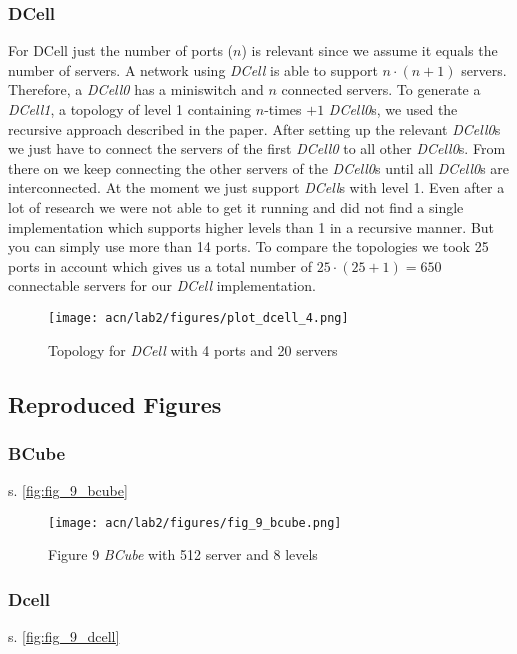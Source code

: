 \documentclass[a4paper,11pt]{article}
\begin{document}
\subsubsection{DCell}
For DCell just the number of ports ($n$) is relevant since we assume it equals the number of servers.
A network using \textit{DCell} is able to support $n \cdot (n + 1)$ servers.
Therefore, a \textit{DCell0} has a miniswitch and $n$ connected servers.
To generate a \textit{DCell1}, a topology of level 1 containing $n$-times $+1$ \textit{DCell0}s, we used the recursive approach described in the paper.
After setting up the relevant \textit{DCell0}s we just have to connect the servers of the first \textit{DCell0} to all other \textit{DCell0}s.
From there on we keep connecting the other servers of the \textit{DCell0}s until all \textit{DCell0}s are interconnected.
At the moment we just support \textit{DCell}s with level 1.
Even after a lot of research we were not able to get it running and did not find a single implementation which supports higher levels than 1 in a recursive manner.
But you can simply use more than 14 ports.
To compare the topologies we took 25 ports in account which gives us a total number of $25\cdot (25 +1)= 650$ connectable servers for our \textit{DCell} implementation.

\begin{figure}[ht]
    \centering
    \texttt{[image: acn/lab2/figures/plot\_dcell\_4.png]}
    \caption{Topology for \textit{DCell} with 4 ports and 20 servers}
    \label{fig:topo_dcell}
\end{figure}

\subsection{Reproduced Figures}

\subsubsection{BCube}
s. \autoref{fig:fig_9_bcube}
\begin{figure}[ht]
    \centering
    \texttt{[image: acn/lab2/figures/fig\_9\_bcube.png]}
    \caption{Figure 9 \textit{BCube} with 512 server and 8 levels}
    \label{fig:fig_9_bcube}
\end{figure}

\subsubsection{Dcell}
s. \autoref{fig:fig_9_dcell}
\end{document}
